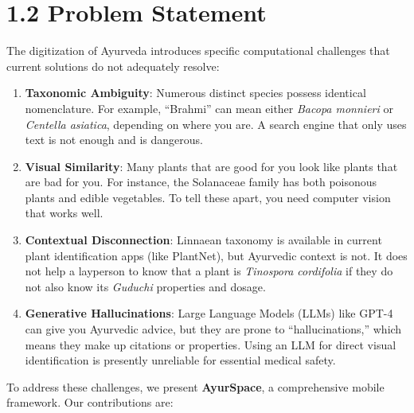 \documentclass[12pt]{article}
\begin{document}
\newpage

\section*{1.2 \quad Problem Statement}

The digitization of Ayurveda introduces specific computational challenges that current solutions
do not adequately resolve:

\begin{enumerate}[label={\textbf{\arabic*.}}, leftmargin=*]
    \item \textbf{Taxonomic Ambiguity}: Numerous distinct species possess identical nomenclature.
    For example, ``Brahmi'' can mean either \textit{Bacopa monnieri} or
    \textit{Centella asiatica}, depending on where you are. A search engine that only uses text
    is not enough and is dangerous.

    \item \textbf{Visual Similarity}: Many plants that are good for you look like plants that are
    bad for you. For instance, the Solanaceae family has both poisonous plants and edible
    vegetables. To tell these apart, you need computer vision that works well.

    \item \textbf{Contextual Disconnection}: Linnaean taxonomy is available in current plant
    identification apps (like PlantNet), but Ayurvedic context is not. It does not help a layperson
    to know that a plant is \textit{Tinospora cordifolia} if they do not also know its
    \textit{Guduchi} properties and dosage.

    \item \textbf{Generative Hallucinations}: Large Language Models (LLMs) like GPT-4 can give you
    Ayurvedic advice, but they are prone to ``hallucinations,'' which means they make up citations
    or properties. Using an LLM for direct visual identification is presently unreliable for
    essential medical safety.
\end{enumerate}

To address these challenges, we present \textbf{AyurSpace}, a comprehensive mobile framework. Our
contributions are:
\end{document}
